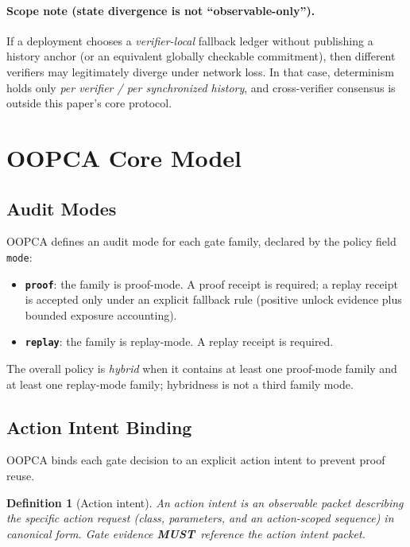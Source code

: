 \documentclass[11pt]{article}
\newcommand{\MUST}{\textbf{MUST}}
\newtheorem{definition}{Definition}
\begin{document}
\paragraph{Scope note (state divergence is not ``observable-only'').}
If a deployment chooses a \emph{verifier-local} fallback ledger without publishing a history anchor (or an equivalent globally checkable commitment), then different verifiers may legitimately diverge under network loss.
In that case, determinism holds only \emph{per verifier / per synchronized history}, and cross-verifier consensus is outside this paper's core protocol.


\section{OOPCA Core Model}\label{sec:core}

\subsection{Audit Modes}

OOPCA defines an audit mode for each gate family, declared by the policy field \texttt{mode}:
\begin{itemize}[leftmargin=1.2em]
  \item \textbf{\texttt{proof}}: the family is proof-mode. A proof receipt is required; a replay receipt is accepted only under an explicit fallback rule (positive unlock evidence plus bounded exposure accounting).
  \item \textbf{\texttt{replay}}: the family is replay-mode. A replay receipt is required.
\end{itemize}
The overall policy is \emph{hybrid} when it contains at least one proof-mode family and at least one replay-mode family; hybridness is not a third family mode.

\subsection{Action Intent Binding}

OOPCA binds each gate decision to an explicit action intent to prevent proof reuse.

\begin{definition}[Action intent]
An action intent is an observable packet describing the specific action request (class, parameters, and an action-scoped sequence) in canonical form. Gate evidence \MUST\ reference the action intent packet.
\end{definition}
\end{document}
